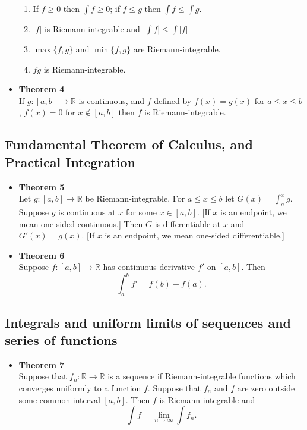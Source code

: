 \documentclass[11pt,a4paper]{article}
\begin{document}
\begin{itemize}
\begin{enumerate}
            \item If $f \geq 0$ then $\int f \geq 0$; if $f \leq g$ then $\int f \leq \int g$.
            \item $|f|$ is Riemann-integrable and $| \int f| \leq \int |f|$
            \item $\max \{f, g\}$ and $\min \{f, g\}$ are Riemann-integrable.
            \item $fg$ is Riemann-integrable.
        \end{enumerate}

    \item \textbf{Theorem 4} \\
        If $g : [a, b] \to \mathbb{R}$ is continuous, and $f$ defined by $f(x) = g(x)$
        for $a \leq x \leq b$, $f(x) = 0$ for $x \notin [a, b]$ then $f$ is Riemann-integrable.
\end{itemize}

\subsection{Fundamental Theorem of Calculus, and Practical Integration}

\begin{itemize}
    \item \textbf{Theorem 5} \\
        Let $g : [a, b] \to \mathbb{R}$ be Riemann-integrable.
        For $a \leq x \leq b$ let $G(x) = \int_a^x g$.
        Suppose $g$ is continuous at $x$ for some $x \in [a, b]$.
        [If $x$ is an endpoint, we mean one-sided continuous.]
        Then $G$ is differentiable at $x$ and $G'(x) = g(x)$.
        [If $x$ is an endpoint, we mean one-sided differentiable.]

    \item \textbf{Theorem 6} \\
        Suppose $f : [a, b] \to \mathbb{R}$ has continuous derivative $f'$ on $[a, b]$.
        Then
        \[
            \int_a^b f' = f(b) - f(a).
        \]

\end{itemize}

\subsection{Integrals and uniform limits of sequences and series of functions}

\begin{itemize}

    \item \textbf{Theorem 7} \\
        Suppose that $f_n : \mathbb{R} \to \mathbb{R}$ is a sequence if Riemann-integrable
        functions which converges uniformly to a function $f$.
        Suppose that $f_n$ and $f$ are zero outside some common interval $[a, b]$.
        Then $f$ is Riemann-integrable and
        \[
            \int f = \lim_{n \to \infty} \int f_n.
        \]

\end{itemize}
\end{document}
